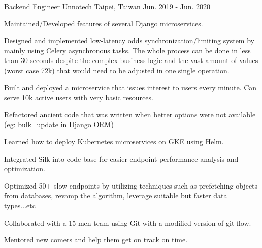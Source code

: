 \begin{cventries}
  \cventry
    {Backend Engineer} %
    {Unnotech} %
    {Taipei, Taiwan} %
    {Jun. 2019 - Jun. 2020} %
    {
      \begin{cvitems} %
        \item {Maintained/Developed features of several Django microservices. }
        \item {Designed and implemented low-latency odds synchronization/limiting system by mainly using Celery asynchronous tasks. The whole process can be done in less than 30 seconds despite the complex business logic and the vast amount of values (worst case 72k) that would need to be adjusted in one single operation. }
        \item {Built and deployed a microservice that issues interest to users every minute. Can serve 10k active users with very basic resources. }
        \item {Refactored ancient code that was written when better options were not available (eg: bulk\_update in Django ORM)}
        \item {Learned how to deploy Kubernetes microservices on GKE using Helm. }
        \item {Integrated Silk into code base for easier endpoint performance analysis and optimization. }
        \item {Optimized 50+ slow endpoints by utilizing techniques such as prefetching objects from databases, revamp the algorithm, leverage suitable but faster data types...etc }
        \item {Collaborated with a 15-men team using Git with a modified version of git flow. }
        \item {Mentored new comers and help them get on track on time. }
      \end{cvitems}
    }


\end{cventries}
